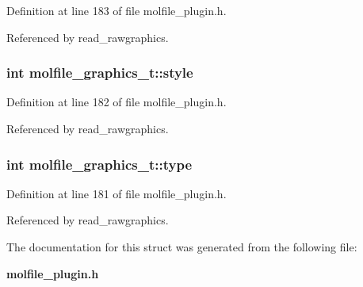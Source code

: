 Definition at line 183 of file molfile\_\-plugin.h.

Referenced by read\_\-rawgraphics.
\subsubsection{\setlength{\rightskip}{0pt plus 5cm}int molfile\_\-graphics\_\-t::style}\label{structmolfile__graphics__t_m1}




Definition at line 182 of file molfile\_\-plugin.h.

Referenced by read\_\-rawgraphics.
\subsubsection{\setlength{\rightskip}{0pt plus 5cm}int molfile\_\-graphics\_\-t::type}\label{structmolfile__graphics__t_m0}




Definition at line 181 of file molfile\_\-plugin.h.

Referenced by read\_\-rawgraphics.

The documentation for this struct was generated from the following file:\begin{CompactItemize}
\item 
{\bf molfile\_\-plugin.h}\end{CompactItemize}
